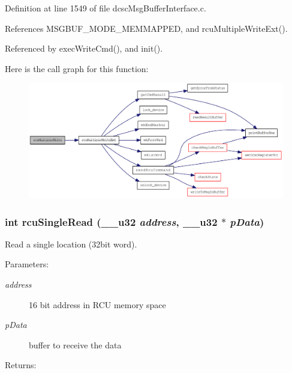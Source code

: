 Definition at line 1549 of file dcsc\-Msg\-Buffer\-Interface.c.

References MSGBUF\_\-MODE\_\-MEMMAPPED, and rcu\-Multiple\-Write\-Ext().

Referenced by exec\-Write\-Cmd(), and init().

Here is the call graph for this function:\begin{figure}[H]
\begin{center}
\leavevmode
\includegraphics[width=356pt]{group__dcsc__msg__buffer__access_ge20afbfc92c897546e37126188804309_cgraph}
\end{center}
\end{figure}
\hypertarget{group__dcsc__msg__buffer__access_g339b5922513d0f0211d7962234faa24f}{
\subsubsection[rcuSingleRead]{\setlength{\rightskip}{0pt plus 5cm}int rcu\-Single\-Read (\_\-\_\-u32 {\em address}, \_\-\_\-u32 $\ast$ {\em p\-Data})}}
\label{group__dcsc__msg__buffer__access_g339b5922513d0f0211d7962234faa24f}


Read a single location (32bit word). 

\begin{Desc}
\item[Parameters:]
\begin{description}
\item[{\em address}]16 bit address in RCU memory space \item[{\em p\-Data}]buffer to receive the data \end{description}
\end{Desc}
\begin{Desc}
\item[Returns:]\end{Desc}


